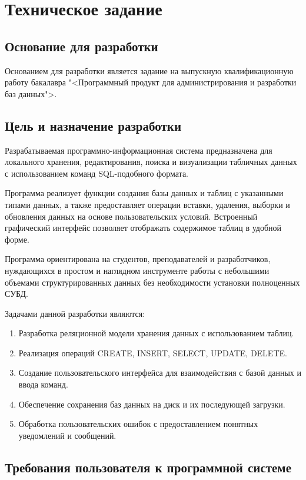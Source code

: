 \section{Техническое задание}
\subsection{Основание для разработки}

Основанием для разработки является задание на выпускную квалификационную работу бакалавра "<Программный продукт для администрирования и разработки баз данных">.

\subsection{Цель и назначение разработки}

Разрабатываемая программно-информационная система предназначена для локального хранения, редактирования, поиска и визуализации табличных данных с использованием команд SQL-подобного формата.

Программа реализует функции создания базы данных и таблиц с указанными типами данных, а также предоставляет операции вставки, удаления, выборки и обновления данных на основе пользовательских условий. Встроенный графический интерфейс позволяет отображать содержимое таблиц в удобной форме.

Программа ориентирована на студентов, преподавателей и разработчиков, нуждающихся в простом и наглядном инструменте работы с небольшими объемами структурированных данных без необходимости установки полноценных СУБД.

Задачами данной разработки являются:
\begin{enumerate}
\item Разработка реляционной модели хранения данных с использованием таблиц.
\item Реализация операций CREATE, INSERT, SELECT, UPDATE, DELETE.
\item Создание пользовательского интерфейса для взаимодействия с базой данных и ввода команд.
\item Обеспечение сохранения баз данных на диск и их последующей загрузки.
\item Обработка пользовательских ошибок с предоставлением понятных уведомлений и сообщений.
\end{enumerate}

\subsection{Требования пользователя к программной системе}

